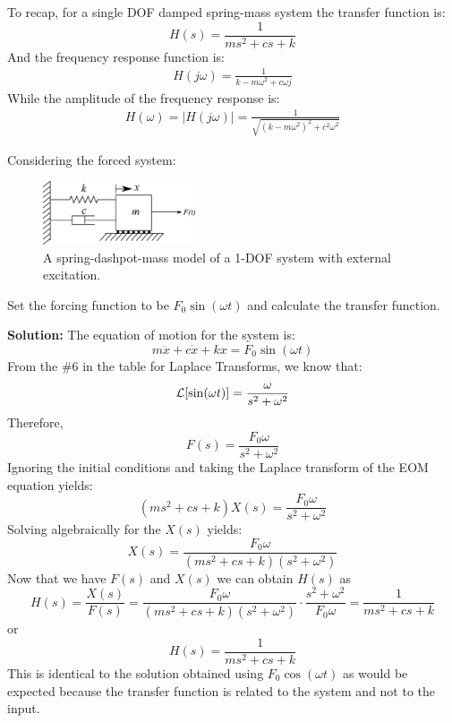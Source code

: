 \documentclass[12pt,letter]{article}
\begin{document}
To recap, for a single DOF damped spring-mass system the transfer function is:
\begin{equation}
H(s) = \frac{1}{ms^2+cs+k}
\end{equation}
And the frequency response function is:
\begin{eqnarray}
H(j\omega) = \frac{1}{k-m\omega^2+c\omega j}
\end{eqnarray}
While the amplitude of the frequency response is:
\begin{eqnarray}
H(\omega) = |H(j\omega)| = \frac{1}{\sqrt{(k-m\omega^2)^2+c^2\omega^2}}
\end{eqnarray}

\begin{example}
	Considering the forced system:
	\begin{figure}[H]
		\centering
		\includegraphics[width=0.4\textwidth]{../figures/1-DOF-spring_dashpot_mass_horizontal_forced.png}
		\caption{A spring-dashpot-mass model of a 1-DOF system with external excitation.}
	\end{figure}
	Set the forcing function to be $F_0 \sin(\omega t)$ and calculate the transfer function. 
	
	\noindent\textbf{Solution:} The equation of motion for the system is:
	\begin{equation}
		m\ddot{x} + c\dot{x} +kx = F_0 \sin(\omega t)
	\end{equation}
	From the \#6 in the table for Laplace Transforms, we know that:
	\begin{equation}
		\mathcal{L}{\left[\sin(\omega t)\right]} = \frac{\omega}{s^2+\omega^2}
	\end{equation}
	Therefore, 
	\begin{equation}
	F(s) = \frac{F_0\omega}{s^2+\omega^2}
	\end{equation}
	Ignoring the initial conditions and taking the Laplace transform of the EOM equation yields:
	\begin{equation}
	(ms^2 + cs +k)X(s) = \frac{F_0 \omega}{s^2+\omega^2} 
	\end{equation}
	Solving algebraically for the $X(s)$ yields: 
	\begin{equation}
	X(s) = \frac{F_0\omega}{(ms^2 + cs +k)(s^2+\omega^2)}
	\end{equation}
	Now that we have $F(s)$ and $X(s)$ we can obtain $H(s)$ as  
	\begin{equation}
	H(s) = \frac{X(s)}{F(s)} = \frac{F_0 \omega }{(ms^2 + cs +k)(s^2+\omega^2)} \cdot \frac{s^2+\omega^2}{F_0 \omega} = \frac{1}{ms^2+cs+k}
	\end{equation}
	or 
	\begin{equation}
	H(s) = \frac{1}{ms^2+cs+k}
	\end{equation}
	This is identical to the solution obtained using $F_0 \cos(\omega t)$ as would be expected because the transfer function is related to the system and not to the input. 
\end{example}  
\end{document}
